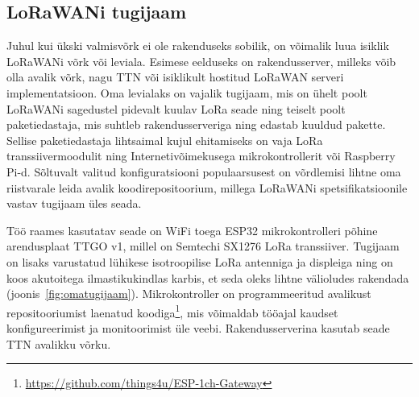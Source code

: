 \documentclass[12pt]{article}
\begin{document}
    \subsection{LoRaWANi tugijaam}

    Juhul kui ükski valmisvõrk ei ole rakenduseks sobilik, on võimalik luua isiklik LoRaWANi võrk või leviala.
    Esimese eelduseks on rakendusserver, milleks võib olla avalik võrk, nagu TTN või isiklikult hostitud LoRaWAN serveri implementatsioon.
    Oma levialaks on vajalik tugijaam, mis on ühelt poolt LoRaWANi sagedustel pidevalt kuulav LoRa seade ning teiselt poolt paketiedastaja, mis suhtleb rakendusserveriga ning edastab kuuldud pakette.
    Sellise paketiedastaja lihtsaimal kujul ehitamiseks on vaja LoRa transsiivermoodulit ning Internetivõimekusega mikrokontrollerit või Raspberry Pi-d.
    Sõltuvalt valitud konfiguratsiooni populaarsusest on võrdlemisi lihtne oma riistvarale leida avalik koodirepositoorium, millega LoRaWANi spetsifikatsioonile vastav tugijaam üles seada.

    Töö raames kasutatav seade on WiFi toega ESP32 mikrokontrolleri põhine arendusplaat TTGO v1, millel on Semtechi SX1276 LoRa transsiiver.
    Tugijaam on lisaks varustatud lühikese isotroopilise LoRa antenniga ja displeiga ning on koos akutoitega ilmastikukindlas karbis, et seda oleks lihtne välioludes rakendada (joonis~\ref{fig:omatugijaam}).
    Mikrokontroller on programmeeritud avalikust repositooriumist laenatud koodiga\footnote{\url{https://github.com/things4u/ESP-1ch-Gateway}}, mis võimaldab tööajal kaudset konfigureerimist ja monitoorimist üle veebi.
    Rakendusserverina kasutab seade TTN avalikku võrku.
\end{document}
